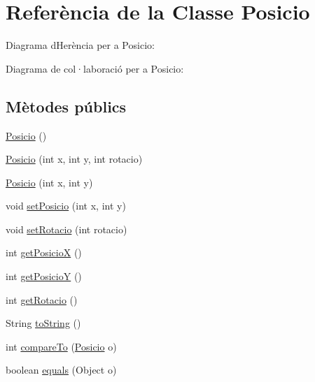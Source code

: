 \hypertarget{class_posicio}{}\section{Referència de la Classe Posicio}
\label{class_posicio}


Diagrama d\textquotesingle{}Herència per a Posicio\+:


Diagrama de col·laboració per a Posicio\+:
\subsection*{Mètodes públics}
\begin{DoxyCompactItemize}
\item 
\mbox{\hyperlink{class_posicio_ac0f4cc6a7db7c5d1ff6260ef51bd7c25}{Posicio}} ()
\item 
\mbox{\hyperlink{class_posicio_a3b96d8c2e418d9ea137952db741ccc43}{Posicio}} (int x, int y, int rotacio)
\item 
\mbox{\hyperlink{class_posicio_ae06a3e02ea3f31a2f3863ffdb43deb4b}{Posicio}} (int x, int y)
\item 
void \mbox{\hyperlink{class_posicio_ae5d039250fb3edeaf683c6e39f7495bc}{set\+Posicio}} (int x, int y)
\item 
void \mbox{\hyperlink{class_posicio_a74e21bbf58a371bbd77a6a9d98953de3}{set\+Rotacio}} (int rotacio)
\item 
int \mbox{\hyperlink{class_posicio_a8a1ae0a7865e6edbf0510ebcf2b97061}{get\+PosicioX}} ()
\item 
int \mbox{\hyperlink{class_posicio_ae70d63aa90b935131d122fc1e4b72969}{get\+PosicioY}} ()
\item 
int \mbox{\hyperlink{class_posicio_ad41dbf5580623be4bfa053825900c9e9}{get\+Rotacio}} ()
\item 
String \mbox{\hyperlink{class_posicio_aa150553319e5f09a7de09f7d0065b290}{to\+String}} ()
\item 
int \mbox{\hyperlink{class_posicio_a32c10a9021c636eee8dcbe85f348389a}{compare\+To}} (\mbox{\hyperlink{class_posicio}{Posicio}} o)
\item 
boolean \mbox{\hyperlink{class_posicio_aace143f99edb1146822d21ed40e9217d}{equals}} (Object o)
\end{DoxyCompactItemize}
